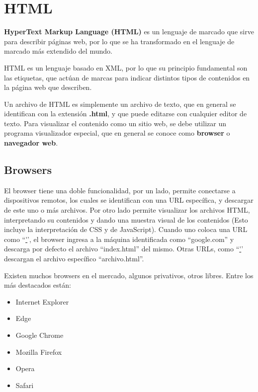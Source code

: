 
\chapter{HTML}
\label{anex:html}

\textbf{HyperText Markup Language (HTML)} es un lenguaje de marcado que sirve
para describir páginas web, por lo que se ha transformado en el lenguaje de
marcado más extendido del mundo.

HTML es un lenguaje basado en XML, por lo que su principio fundamental son las
etiquetas, que actúan de marcas para indicar distintos tipos de contenidos en la
página web que describen.

Un archivo de HTML es simplemente un archivo de texto, que en general se identifican
con la extensión \textbf{.html}, y que puede editarse con cualquier editor de
texto. Para visualizar el contenido como un sitio web, se debe utilizar un
programa visualizador especial, que en general se conoce como \textbf{browser} o
\textbf{navegador web}.

\section{Browsers}

El browser tiene una doble funcionalidad, por un lado, permite conectarse a
dispositivos remotos, los cuales se identifican con una URL específica, y descargar
de este uno o más archivos. Por otro lado permite visualizar los archivos HTML,
interpretando su contenidos y dando una muestra visual de los contenidos (Esto
incluye la interpretación de CSS y de JavaScript). Cuando uno coloca una URL
como ``\href{http://google.com}'', el browser ingresa a la máquina identificada
como ``google.com'' y descarga por defecto el archivo ``index.html'' del mismo.
Otras URLs, como ``\href{http://google.com/archivo.html}'' descargan el archivo
específico ``archivo.html''.

Existen muchos browsers en el mercado, algunos privativos, otros libres. Entre
los más destacados están:
\begin{itemize}
    \item Internet Explorer
    \item Edge
    \item Google Chrome
    \item Mozilla Firefox
    \item Opera
    \item Safari
\end{itemize}

